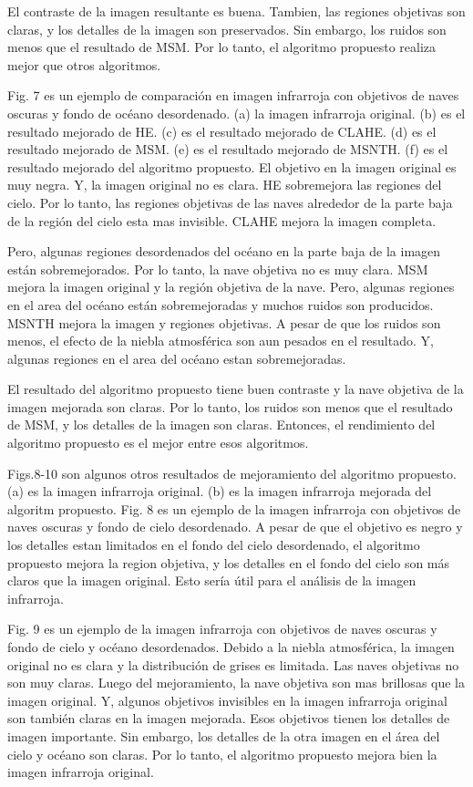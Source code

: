 \documentclass[a4paper, 11 pt, conference]{ieeeconf}      %
\begin{document}
El contraste de la imagen resultante es buena. Tambien, las regiones objetivas son claras, y los detalles de la imagen son preservados. Sin embargo, los ruidos son menos que el resultado de MSM. Por lo tanto, el algoritmo propuesto realiza mejor que otros algoritmos.

Fig. 7 es un ejemplo de comparaci\'on en imagen infrarroja con objetivos de naves oscuras y fondo de oc\'eano desordenado. (a) la imagen infrarroja original. (b) es el resultado mejorado de HE. (c) es el resultado mejorado de CLAHE. (d) es el resultado mejorado de MSM. (e) es el resultado mejorado de MSNTH. (f) es el resultado mejorado del algoritmo propuesto. El objetivo en la imagen original es muy negra. Y, la imagen original no es clara. HE sobremejora las regiones del cielo. Por lo tanto, las regiones objetivas de las naves alrededor de la parte baja de la regi\'on del cielo esta mas invisible. CLAHE mejora la imagen completa. 

Pero, algunas regiones desordenados del oc\'eano en la parte baja de la imagen est\'an sobremejorados. Por lo tanto, la nave objetiva no es muy clara. MSM mejora la imagen original y la regi\'on objetiva de la nave. Pero, algunas regiones en el area del oc\'eano est\'an sobremejoradas y muchos ruidos son producidos. MSNTH mejora la imagen y regiones objetivas. A pesar de que los ruidos son menos, el efecto de la niebla atmosf\'erica son aun pesados en el resultado. Y, algunas regiones en el area del oc\'eano estan sobremejoradas.

El resultado del algoritmo propuesto tiene buen contraste y la nave objetiva de la imagen mejorada son claras. Por lo tanto, los ruidos son menos que el resultado de MSM, y los detalles de la imagen son claras. Entonces, el rendimiento del algoritmo propuesto es el mejor entre esos algoritmos.

Figs.8-10 son algunos otros resultados de mejoramiento del algoritmo propuesto. (a) es la imagen infrarroja original. (b) es la imagen infrarroja mejorada del algoritm propuesto. Fig. 8 es un ejemplo de la imagen infrarroja con objetivos de naves oscuras y fondo de cielo desordenado. A pesar de que el objetivo es negro y los detalles estan limitados en el fondo del cielo desordenado, el algoritmo propuesto mejora la region objetiva, y los detalles en el fondo del cielo son m\'as claros que la imagen original. Esto ser\'ia \'util para el an\'alisis de la imagen infrarroja.

Fig. 9 es un ejemplo de la imagen infrarroja con objetivos de naves oscuras y fondo de cielo y oc\'eano desordenados. Debido   a la niebla atmosf\'erica, la imagen original no es clara y la distribuci\'on de grises es limitada. Las naves objetivas no son muy claras. Luego del mejoramiento, la nave objetiva son mas brillosas que la imagen original. Y, algunos objetivos invisibles en la imagen infrarroja original son tambi\'en claras en la imagen mejorada. Esos objetivos tienen los detalles de imagen importante. Sin embargo, los detalles de la otra imagen en el \'area del cielo y oc\'eano son claras. Por lo tanto, el algoritmo propuesto mejora bien la imagen infrarroja original.
\end{document}

